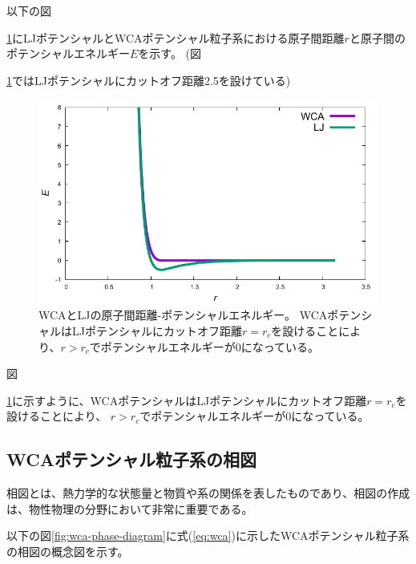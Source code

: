 \documentclass[titlepage]{jsreport}
\begin{document}
以下の図{\ref{fig:dis-poen}にLJポテンシャルとWCAポテンシャル粒子系における原子間距離$r$と原子間のポテンシャルエネルギー$E$を示す。
(図{\ref{fig:dis-poen}ではLJポテンシャルにカットオフ距離2.5を設けている)

\newpage
\begin{figure}[htbp]
    \begin{center}
        \includegraphics[width=14cm]{fig/dis-poen.pdf}
    \end{center}
    \caption{WCAとLJの原子間距離-ポテンシャルエネルギー。
    WCAポテンシャルはLJポテンシャルにカットオフ距離$r=r_c$を設けることにより、$r>r_c$でポテンシャルエネルギーが0になっている。}
    \label{fig:dis-poen}
\end{figure}
図{\ref{fig:dis-poen}に示すように、WCAポテンシャルはLJポテンシャルにカットオフ距離$r=r_c$を設けることにより、
$r>r_c$でポテンシャルエネルギーが0になっている。


\subsection{WCAポテンシャル粒子系の相図}\label{method-subsec:WCA-phase}
相図とは、熱力学的な状態量と物質や系の関係を表したものであり、相図の作成は、物性物理の分野において非常に重要である\cite{gaussian-phase}。

以下の図\ref{fig:wca-phase-diagram}に式(\ref{eq:wca})に示したWCAポテンシャル粒子系の相図の概念図を示す。

}}}
\end{document}
